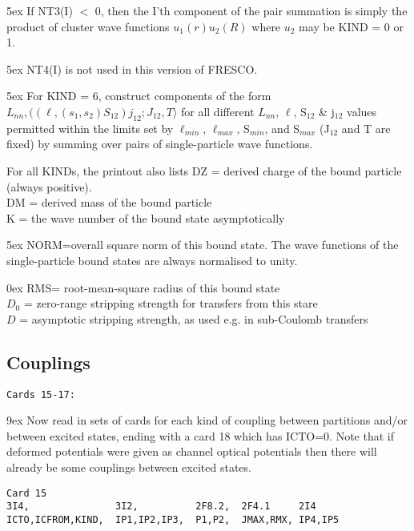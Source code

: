 \documentclass[11pt]{article}
\begin{document}
\hangindent 5ex
If NT3(I) $<$ 0, then the I'th component of the pair summation is simply
the product of cluster wave functions $u_1(r)  u_2(R) $
where $u_{2}$ may be KIND = 0 or 1.
\bigskip

\hangindent 5ex
NT4(I) is not used in this version of FRESCO.
\bigskip

\hangindent 5ex
For KIND = 6, construct components of the form
$
              L_{nn}, ((\ell, (s_1,s_2)S_{12})j_{12}; J_{12},T\rangle
$
for all different $L_{nn}$, $\ell$, S$_{12}$ \& j$_{12}$ values permitted within the
limits set by $\ell_{min}$, $\ell_{max}$, S$_{min}$, and S$_{max}$
(J$_{12}$ and T are fixed)
by summing over pairs of single-particle wave functions.
\bigskip

For all KINDs, the printout also lists
\bigskip
DZ = derived charge of the bound particle (always positive).
\\
DM = derived mass of the bound particle
\\
K  = the wave number of the bound state asymptotically

\hangindent 5ex
NORM=overall square norm of this bound state.
The wave functions of the single-particle bound states are always
normalised to unity.

\hangindent 0ex
RMS= root-mean-square radius of this bound state
\\
$D_{0}$ = zero-range stripping strength for transfers from this stare
\\
$D$  = asymptotic stripping strength, as used e.g. in sub-Coulomb
transfers


\newpage
\subsection{Couplings}
%

\begin{verbatim}
Cards 15-17:
\end{verbatim}

\hangindent 9ex
Now read in sets of cards for each kind of coupling between partitions
and/or between excited states, ending with a card 18 which has ICTO=0.
Note that if deformed potentials were given as channel optical
potentials then there will already be some couplings between
excited states.

\begin{verbatim}
Card 15
3I4,               3I2,          2F8.2,  2F4.1     2I4
ICTO,ICFROM,KIND,  IP1,IP2,IP3,  P1,P2,  JMAX,RMX, IP4,IP5
\end{verbatim}
\end{document}
